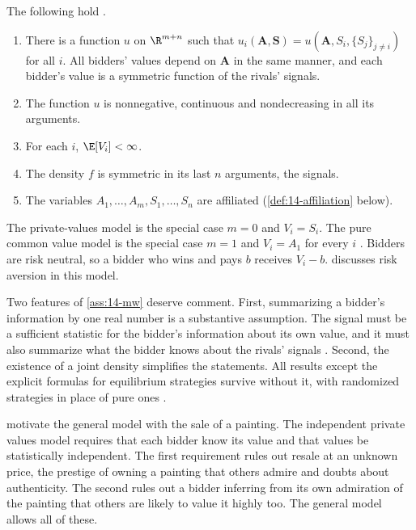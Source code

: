 \begin{assumption}\label{ass:14-mw}
The following hold \citep[Assumptions~1--5, pp.~1097--1098]{MilgromWeber1982}.
\begin{enumerate}[label=(\roman*)]
  \item There is a function $u$ on $\R^{m+n}$ such that $u_i(\bm A,\bm S)=u(\bm A,S_i,\{S_j\}_{j\neq i})$ for
  all $i$. All bidders' values depend on $\bm A$ in the same manner, and each bidder's value is a
  symmetric function of the rivals' signals.
  \item The function $u$ is nonnegative, continuous and nondecreasing in all its arguments.
  \item For each $i$, $\E[V_i]<\infty$.
  \item The density $f$ is symmetric in its last $n$ arguments, the signals.
  \item The variables $A_1,\dots,A_m,S_1,\dots,S_n$ are affiliated (\cref{def:14-affiliation} below).
\end{enumerate}
\end{assumption}

The private-values model is the special case $m=0$ and $V_i=S_i$. The pure common value model is the
special case $m=1$ and $V_i=A_1$ for every $i$ \citep[p.~1098]{MilgromWeber1982}. Bidders are risk neutral,
so a bidder who wins and pays $b$ receives $V_i-b$.  discusses risk aversion in this
model.

Two features of \cref{ass:14-mw} deserve comment. First, summarizing a bidder's information by one real
number is a substantive assumption. The signal must be a sufficient statistic for the bidder's information
about its own value, and it must also summarize what the bidder knows about the rivals' signals
\citep[footnote~14]{MilgromWeber1982}. Second, the existence of a joint density simplifies the statements.
All results except the explicit formulas for equilibrium strategies survive without it, with randomized
strategies in place of pure ones \citep[footnote~15]{MilgromWeber1982}.

\citet[Section~2.3]{MilgromWeber1982} motivate the general model with the sale of a painting. The
independent private values model requires that each bidder know its value and that values be
statistically independent. The first requirement rules out resale at an unknown price, the prestige of
owning a painting that others admire and doubts about authenticity. The second rules out a bidder
inferring from its own admiration of the painting that others are likely to value it highly too. The
general model allows all of these.

